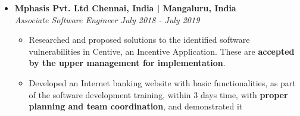 \documentclass[a4paper,11pt]{article}
\newcommand{\isep}{-2 pt}
\newcommand{\spsep}{-0.75cm}
\begin{document}
\begin{itemize}
	\item \textbf{Mphasis Pvt. Ltd  \hfill Chennai, India | Mangaluru, India} \\
	\emph{Associate Software Engineer \hfill July 2018 - July 2019} \\[\spsep]
		\begin{itemize} \itemsep \isep
		\item Researched and proposed solutions to the identified software vulnerabilities in Centive, an Incentive Application. These are \textbf{accepted by the upper management for implementation}.
		\item Developed an Internet banking website with basic functionalities, as part of the software development training, within 3 days time, with \textbf{proper planning and team coordination}, and demonstrated it 
		\end{itemize}
\end{itemize}
\end{document}
